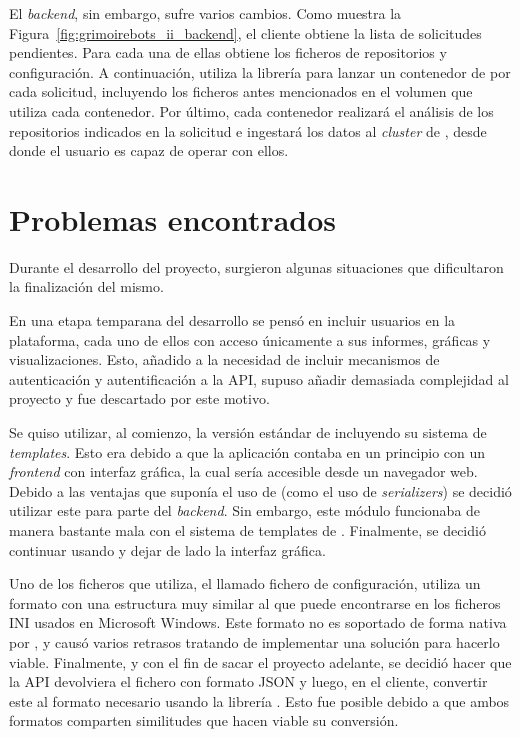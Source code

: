 El \emph{backend}, sin embargo, sufre varios cambios. Como muestra la Figura~\ref{fig:grimoirebots_ii_backend}, el cliente obtiene la lista de solicitudes pendientes. Para cada una de ellas obtiene los ficheros de repositorios y configuración. A continuación, utiliza la librería  para lanzar un contenedor de  por cada solicitud, incluyendo los ficheros antes mencionados en el volumen que utiliza cada contenedor. Por último, cada contenedor realizará el análisis de los repositorios indicados en la solicitud e ingestará los datos al \emph{cluster} de , desde donde el usuario es capaz de operar con ellos.


\section{Problemas encontrados}

Durante el desarrollo del proyecto, surgieron algunas situaciones que dificultaron la finalización del mismo.

En una etapa temparana del desarrollo se pensó en incluir usuarios en la plataforma, cada uno de ellos con acceso únicamente a sus informes, gráficas y visualizaciones. Esto, añadido a la necesidad de incluir mecanismos de autenticación y autentificación a la API, supuso añadir demasiada complejidad al proyecto y fue descartado por este motivo.

Se quiso utilizar, al comienzo, la versión estándar de  incluyendo su sistema de \emph{templates}. Esto era debido a que la aplicación contaba en un principio con un \emph{frontend} con interfaz gráfica, la cual sería accesible desde un navegador web. Debido a las ventajas que suponía el uso de  (como el uso de \emph{serializers}) se decidió utilizar este para parte del \emph{backend}. Sin embargo, este módulo funcionaba de manera bastante mala con el sistema de templates de . Finalmente, se decidió continuar usando  y dejar de lado la interfaz gráfica.

Uno de los ficheros que  utiliza, el llamado fichero de configuración, utiliza un formato con una estructura muy similar al que puede encontrarse en los ficheros INI usados en Microsoft Windows. Este formato no es soportado de forma nativa por , y causó varios retrasos tratando de implementar una solución para hacerlo viable. Finalmente, y con el fin de sacar el proyecto adelante, se decidió hacer que la API devolviera el fichero con formato JSON y luego, en el cliente, convertir este al formato necesario usando la librería . Esto fue posible debido a que ambos formatos comparten similitudes que hacen viable su conversión.

